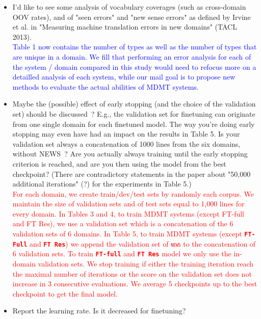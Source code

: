 \documentclass[12pt,times,a4paper,twoside]{article}
\newcommand{\fyTodo}[1]{\Todo[FY:]{\textcolor{orange}{#1}}}
\theoremstyle{definition}
\newcommand{\domain}[1]{\texttt{\textsc{#1}}}
\newcommand{\system}[1]{\texttt{\textbf{#1}}}
\begin{document}
\begin{itemize}
\item I'd like to see some analysis of vocabulary coverages (such as
cross-domain OOV rates), and of "seen errors" and "new sense errors" as defined by Irvine et al. in "Measuring machine translation errors in new domains" (TACL 2013).
\\
\textcolor{blue}{Table 1 now contains the number of types as well as the number of types that are unique in a domain. We fill that performing an error analysis for each of the system / domain compared in this study would need to refocus more on a detailled analysis of each system, while our mail goal is to propose new methods to evaluate the actual abilities of MDMT systems.}\fyTodo{Will this be enough ?}
\\
\item Maybe the (possible) effect of early stopping (and the choice of the validation set) should be discussed~? E.g., the validation set for finetuning can originate from one single domain for each finetuned model. The way you're doing early stopping may even have had an impact on the results in Table 5. Is your validation set always a concatenation of 1000 lines from the six domains, without NEWS~? Are you actually always training until the early stopping criterion is reached, and are you then using the model from the best checkpoint? (There are contradictory statements in the paper about "50,000  additional iterations" (?) for the experiments in Table 5.)
\\
\textcolor{red}{For each domain, we create train/dev/test sets by randomly each corpus. We maintain the size of validation sets and of test sets equal to 1,000 lines for every domain. In Tables 3 and 4, to train MDMT systems (except FT-full and FT Res), we use a validation set which is a concatenation of the 6 validation sets of 6 domains. In Table 5, to train MDMT systems (except \system{FT-Full} and \system{FT Res}) we append the validation set of \domain{news} to the concatenation of 6 validation sets. To train \system{FT-full} and \system{FT Res} model we only use the in-domain validation sets. We stop training if either the training iteration reach the maximal number of iterations or the score on the validation set does not increase in 3 consecutive evaluations. We average 5 checkpoints up to the best checkpoint to get the final model.}\fyTodo{up to the best ?}
\\
\item Report the learning rate. Is it decreased for finetuning?

\end{itemize}
\end{document}
